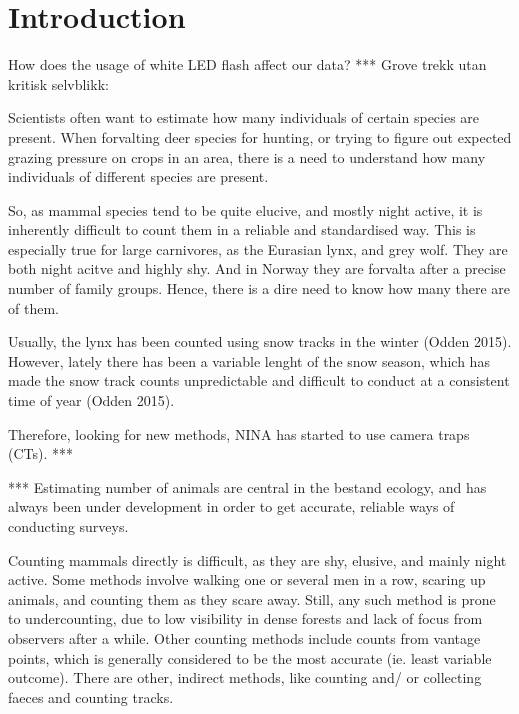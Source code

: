 \chapter{Introduction}


How does the usage of white LED flash affect our data?
***
Grove trekk utan kritisk selvblikk:

Scientists often want to estimate how many individuals of certain species are present. When forvalting deer species for hunting, or trying to figure out expected grazing pressure on crops in an area, there is a need to understand how many individuals of different species are present. %

So, as mammal species tend to be quite elucive, and mostly night active, it is inherently difficult to count them in a reliable and standardised way. This is especially true for large carnivores, as the Eurasian lynx, and grey wolf. They are both night acitve and highly shy. And in Norway they are forvalta after a precise number of family groups. Hence, there is a dire need to know how many there are of them.

Usually, the lynx has been counted using snow tracks in the winter (Odden 2015). However, lately there has been a variable lenght of the snow season, which has made the snow track counts unpredictable and difficult to conduct at a consistent time of year (Odden 2015).

Therefore, looking for new methods, NINA has started to use camera traps (CTs).
***

***
Estimating number of animals are central in the bestand ecology, and has always been under development in order to get accurate, reliable ways of conducting surveys.

Counting mammals directly is difficult, as they are shy, elusive, and mainly night active. Some methods involve walking one or several men in a row, scaring up animals, and counting them as they scare away. Still, any such method is prone to undercounting, due to low visibility in dense forests and lack of focus from observers after a while. Other counting methods include counts from vantage points, which is generally considered to be the most accurate (ie. least variable outcome). There are other, indirect methods, like counting and/ or collecting faeces and counting tracks.

